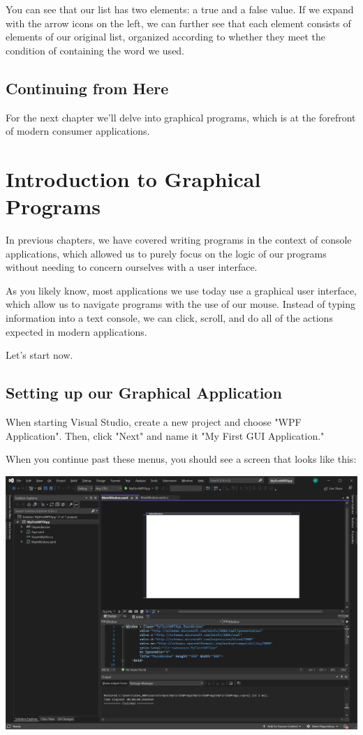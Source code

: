 \documentclass[oneside, openany] {book}
\begin{document}
You can see that our list has two elements: a true and a false value. If we expand with the arrow icons on the left, we can further see that each element consists of elements of our original list, organized according to whether they meet the condition of containing the word we used.
\section*{Continuing from Here}
For the next chapter we'll delve into graphical programs, which is at the forefront of modern consumer applications.
\chapter{Introduction to Graphical Programs}
\minitoc
{}
In previous chapters, we have covered writing programs in the context of console applications, which allowed us to purely focus on the logic of our programs without needing to concern ourselves with a user interface.

As you likely know, most applications we use today use a graphical user interface, which allow us to navigate programs with the use of our mouse. Instead of typing information into a text console, we can click, scroll, and do all of the actions expected in modern applications.

Let's start now.
\section{Setting up our Graphical Application}
When starting Visual Studio, create a new project and choose "WPF Application". Then, click "Next" and name it "My First GUI Application."

When you continue past these menus, you should see a screen that looks like this:


\includegraphics[scale = 0.2]{WPF}
\end{document}
